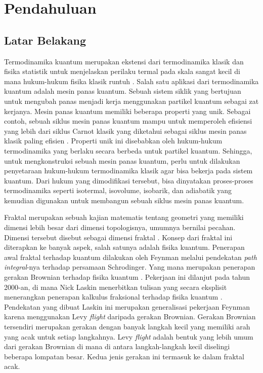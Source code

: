 \chapter{Pendahuluan}
\section{Latar Belakang}
\par Termodinamika kuantum merupakan ekstensi dari termodinamika klasik dan fisika statistik untuk menjelaskan perilaku termal pada skala sangat kecil di mana hukum-hukum fisika klasik runtuh \cite{Deffner2019Thermo}. Salah satu aplikasi dari termodinamika kuantum adalah mesin panas kuantum. Sebuah sistem siklik yang bertujuan untuk mengubah panas menjadi kerja menggunakan partikel kuantum sebagai zat kerjanya. Mesin panas kuantum memiliki beberapa properti yang unik. Sebagai contoh, sebuah siklus mesin panas kuantum mampu untuk memperoleh efisiensi yang lebih dari siklus Carnot klasik yang diketahui sebagai siklus mesin panas klasik paling efisien \cite{Kosloff2014Engines}. Properti unik ini disebabkan oleh hukum-hukum termodinamika yang berlaku secara berbeda untuk partikel kuantum. Sehingga, untuk mengkonstruksi sebuah mesin panas kuantum, perlu untuk dilakukan penyetaraan hukum-hukum termodinamika klasik agar bisa bekerja pada sistem kuantum. Dari hukum yang dimodifikasi tersebut, bisa dinyatakan proses-proses termodinamika seperti isotermal, isovolume, isobarik, dan adiabatik yang kemudian digunakan untuk membangun sebuah siklus mesin panas kuantum. \cite{Vinjanampathy2016Quantum}
\par Fraktal merupakan sebuah kajian matematis tentang geometri yang memiliki dimensi lebih besar dari dimensi topologisnya, umumnya bernilai pecahan. Dimensi tersebut disebut sebagai dimensi fraktal \cite{Mandelbrot1982Fractal}. Konsep dari fraktal ini diterapkan ke banyak aspek, salah satunya adalah fisika kuantum. Penerapan awal fraktal terhadap kuantum dilakukan oleh Feynman melalui pendekatan \textit{path integral}-nya terhadap persamaan Schrodinger. Yang mana merupakan penerapan gerakan Brownian terhadap fisika kuantum \cite{Feynman1948Quantum}. Pekerjaan ini dilanjut pada tahun 2000-an, di mana Nick Laskin menerbitkan tulisan yang secara eksplisit menerangkan penerapan kalkulus fraksional terhadap fisika kuantum \cite{Laskin2000Fractional}. Pendekatan yang dibuat Laskin ini merupakan generalisasi pekerjaan Feynman karena menggunakan Levy \textit{flight} daripada gerakan Brownian. Gerakan Brownian tersendiri merupakan gerakan dengan banyak langkah kecil yang memiliki arah yang acak untuk setiap langkahnya. Levy \textit{flight} adalah bentuk yang lebih umum dari gerakan Brownian di mana di antara langkah-langkah kecil diselingi beberapa lompatan besar. Kedua jenis gerakan ini termasuk ke dalam fraktal acak. \cite{Laskin2018Fractional}
